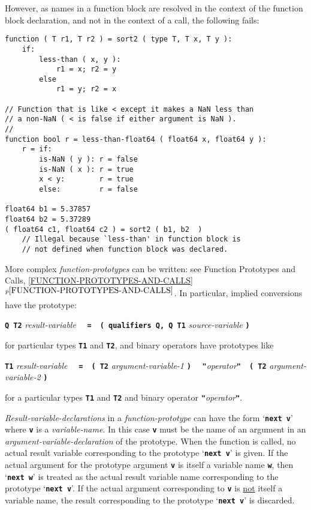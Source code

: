 \documentclass[12pt]{article}
\newcommand{\TT}[1]{{\tt \bfseries #1}}
\newcommand{\itemref}[1]{\ref{#1}$^{p\pageref{#1}}$}
\newenvironment{indpar}[1][0.3in]%
	{\begin{list}{}%
		     {\setlength{\itemsep}{0in}%
		      \setlength{\topsep}{0in}%
		      \setlength{\parsep}{1ex}%
		      \setlength{\labelwidth}{#1}%
		      \setlength{\leftmargin}{#1}%
		      \addtolength{\leftmargin}{\labelsep}}%
	 \item}%
	{\end{list}}
\begin{document}
However, as names in a function block are resolved in the context
of the function block declaration, and not in the context of a
call, the following fails:
\begin{indpar}\begin{verbatim}
function ( T r1, T r2 ) = sort2 ( type T, T x, T y ):
    if:
        less-than ( x, y ):
            r1 = x; r2 = y
        else
            r1 = y; r2 = x

// Function that is like < except it makes a NaN less than
// a non-NaN ( < is false if either argument is NaN ).
//
function bool r = less-than-float64 ( float64 x, float64 y ):
    r = if:
        is-NaN ( y ): r = false
        is-NaN ( x ): r = true
        x < y:        r = true
        else:         r = false

float64 b1 = 5.37857
float64 b2 = 5.37289
( float64 c1, float64 c2 ) = sort2 ( b1, b2  )
    // Illegal because `less-than' in function block is
    // not defined when function block was declared.
\end{verbatim}\end{indpar}

More complex {\em function-prototypes} can be written:
see Function Prototypes and Calls, \itemref{FUNCTION-PROTOTYPES-AND-CALLS}.
In particular, implied conversions have the prototype:
\begin{center}
\TT{Q T2} {\em result-variable}%
    ~~\TT{=}~~\TT{( qualifiers Q, Q T1} {\em source-variable} \TT{)}
\end{center}
for particular types \TT{T1} and \TT{T2}, and binary operators have prototypes
like
\begin{center}
\TT{T1} {\em result-variable}%
    ~~\TT{=}~~\TT{( T2} {\em argument-variable-1} \TT{)}
    ~~\TT{"}{\em operator}\TT{"}~~\TT{( T2} {\em argument-variable-2} \TT{)}
\end{center}
for a particular types \TT{T1} and \TT{T2}
and binary operator \TT{"}{\em operator}\TT{"}.

{\em Result-variable-declarations} in a {\em function-prototype}
can have the form `\TT{next~v}' where \TT{v} is a {\em variable-name}.%
In this case \TT{v} must be the name of
an argument in an {\em argument-variable-declaration} of
the prototype.
When the function is called, no actual result variable corresponding
to the prototype `\TT{next v}' is given.
If the actual argument for the prototype argument \TT{v} is itself
a variable name \TT{w}, then `\TT{next w}' is treated as the actual
result variable name corresponding to the prototype `\TT{next v}'.
If the actual argument corresponding to \TT{v}
is \underline{not} itself a variable name, the result corresponding
to the prototype `\TT{next v}' is discarded.
\end{document}
